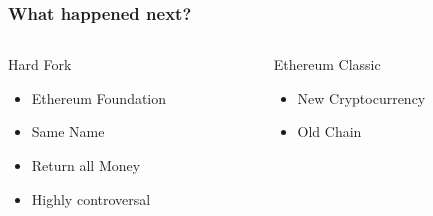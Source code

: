 \documentclass{beamer}
\begin{document}
\begin{frame}[fragile]
  \frametitle{What happened next?}
  \begin{columns}
    \begin{column}{0.5\textwidth}
      Hard Fork
      \begin{itemize}
        \item Ethereum Foundation
        \item Same Name
        \item Return all Money
        \item Highly controversal
      \end{itemize}
    \end{column}
    \pause
    \begin{column}{0.5\textwidth}
      Ethereum Classic
      \begin{itemize}
        \item New Cryptocurrency
        \item Old Chain
      \end{itemize}
    \end{column}
  \end{columns}
\end{frame}


\end{document}
